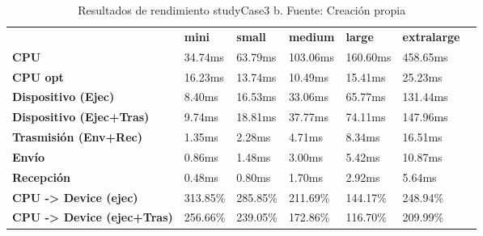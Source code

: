 \begin{table}[H]
    \centering
    \begin{tabular}{lllllll}
    \rowcolor[HTML]{DAE8FC} \ &  \textbf{mini} &  \textbf{small} &  \textbf{medium} &  \textbf{	large} &  \textbf{	extralarge} \\
    \cellcolor[HTML]{DAE8FC} \textbf{CPU} & 34.74ms & 63.79ms & 103.06ms & 	160.60ms & 	458.65ms \\
    \rowcolor[HTML]{EFEFEF} \cellcolor[HTML]{DAE8FC} \textbf{CPU opt} & 16.23ms & 13.74ms & 10.49ms & 	15.41ms & 	25.23ms \\
    \cellcolor[HTML]{DAE8FC} \textbf{Dispositivo (Ejec)} & 8.40ms & 16.53ms & 33.06ms & 	65.77ms & 	131.44ms \\
    \rowcolor[HTML]{EFEFEF} \cellcolor[HTML]{DAE8FC} \textbf{Dispositivo (Ejec+Tras)} & 9.74ms & 18.81ms & 37.77ms & 	74.11ms & 	147.96ms \\
    \cellcolor[HTML]{DAE8FC} \textbf{Trasmisión (Env+Rec)} & 1.35ms & 2.28ms & 4.71ms & 	8.34ms & 	16.51ms \\
    \rowcolor[HTML]{EFEFEF} \cellcolor[HTML]{DAE8FC} \textbf{Envío} & 0.86ms & 1.48ms & 3.00ms & 	5.42ms & 	10.87ms \\
    \cellcolor[HTML]{DAE8FC} \textbf{Recepción} & 0.48ms & 0.80ms & 1.70ms & 	2.92ms & 	5.64ms \\
    \rowcolor[HTML]{EFEFEF} \cellcolor[HTML]{DAE8FC} \textbf{CPU -> Device (ejec)} & 313.85\% & 285.85\% & 211.69\% & 	144.17\% & 	248.94\% \\
    \cellcolor[HTML]{DAE8FC} \textbf{CPU -> Device (ejec+Tras)} & 256.66\% & 239.05\% & 172.86\% & 	116.70\% & 	209.99\% \\
    \end{tabular}
    \caption[Resultados de rendimiento studyCase3 b]{{Resultados de rendimiento studyCase3 b. Fuente: Creación propia}}
    \label{table_test_studyCase3_b_hw_performanceResults}
\end{table}
